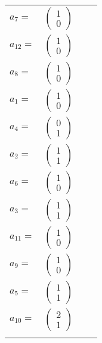 \documentclass[1p]{elsarticle_modified}
\theoremstyle{definition}
\begin{document}
\begin{tabular}{m{7pt} m{180pt} m{7pt} m{180pt} }
\flushright $a_{7}=$&$\begin{pmatrix}1\\0\end{pmatrix}$ \\
\flushright $a_{12}=$&$\begin{pmatrix}1\\0\end{pmatrix}$ \\
\flushright $a_{8}=$&$\begin{pmatrix}1\\0\end{pmatrix}$ \\
\flushright $a_{1}=$&$\begin{pmatrix}1\\0\end{pmatrix}$ \\
\flushright $a_{4}=$&$\begin{pmatrix}0\\1\end{pmatrix}$ \\
\flushright $a_{2}=$&$\begin{pmatrix}1\\1\end{pmatrix}$ \\
\flushright $a_{6}=$&$\begin{pmatrix}1\\0\end{pmatrix}$ \\
\flushright $a_{3}=$&$\begin{pmatrix}1\\1\end{pmatrix}$ \\
\flushright $a_{11}=$&$\begin{pmatrix}1\\0\end{pmatrix}$ \\
\flushright $a_{9}=$&$\begin{pmatrix}1\\0\end{pmatrix}$ \\
\flushright $a_{5}=$&$\begin{pmatrix}1\\1\end{pmatrix}$ \\
\flushright $a_{10}=$&$\begin{pmatrix}2\\1\end{pmatrix}$\\&\end{tabular}
\end{document}

